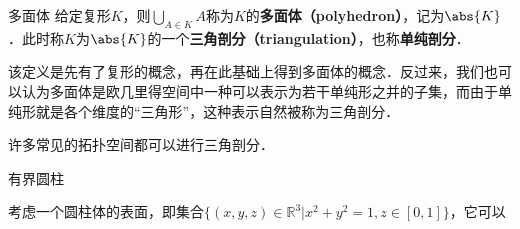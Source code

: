 

\begin{definition}{多面体}
给定复形$K$，则$\bigcup\limits_{A\in K}A$称为$K$的\textbf{多面体（polyhedron）}，记为$\abs{K}$．此时称$K$为$\abs{K}$的一个\textbf{三角剖分（triangulation）}，也称\textbf{单纯剖分}．
\end{definition}

该定义是先有了复形的概念，再在此基础上得到多面体的概念．反过来，我们也可以认为多面体是欧几里得空间中一种可以表示为若干单纯形之并的子集，而由于单纯形就是各个维度的“三角形”，这种表示自然被称为三角剖分．

许多常见的拓扑空间都可以进行三角剖分．

\begin{example}{有界圆柱}

考虑一个圆柱体的表面，即集合$\{(x, y, z)\in\mathbb{R}^3|x^2+y^2=1, z\in [0, 1]\}$，它可以

\end{example}






